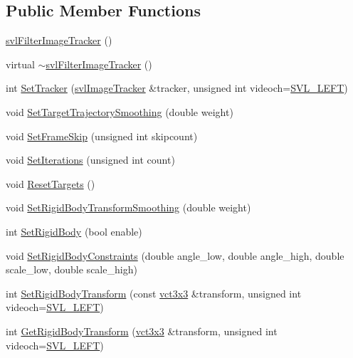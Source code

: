 \subsection*{Public Member Functions}
\begin{DoxyCompactItemize}
\item 
\hyperlink{classsvl_filter_image_tracker_ab2dc7279ace937d9c5f6eb2a5873478c}{svl\-Filter\-Image\-Tracker} ()
\item 
virtual \hyperlink{classsvl_filter_image_tracker_ab055ffc996ecc1bbb30d0ae5aa487996}{$\sim$svl\-Filter\-Image\-Tracker} ()
\item 
int \hyperlink{classsvl_filter_image_tracker_ad67f87d4d599bdd007fb04feb72e4c76}{Set\-Tracker} (\hyperlink{classsvl_image_tracker}{svl\-Image\-Tracker} \&tracker, unsigned int videoch=\hyperlink{svl_definitions_8h_ab9fec7615f19c8df2919eebcab0b187f}{S\-V\-L\-\_\-\-L\-E\-F\-T})
\item 
void \hyperlink{classsvl_filter_image_tracker_ad5a5d26c3cac21daa4843c956a7a73a3}{Set\-Target\-Trajectory\-Smoothing} (double weight)
\item 
void \hyperlink{classsvl_filter_image_tracker_a4a78d211c92d5550f7a7c6a6db90b65c}{Set\-Frame\-Skip} (unsigned int skipcount)
\item 
void \hyperlink{classsvl_filter_image_tracker_a3f6691e08e77208d1b0ca2897b082ac6}{Set\-Iterations} (unsigned int count)
\item 
void \hyperlink{classsvl_filter_image_tracker_a8713ac398b6be0683e08f951c1dd3640}{Reset\-Targets} ()
\item 
void \hyperlink{classsvl_filter_image_tracker_ab7d0a9024fd5fff744a1156265059315}{Set\-Rigid\-Body\-Transform\-Smoothing} (double weight)
\item 
int \hyperlink{classsvl_filter_image_tracker_a7726e5f7fdece4547d1ada917ac232d9}{Set\-Rigid\-Body} (bool enable)
\item 
void \hyperlink{classsvl_filter_image_tracker_a708a3eed66b321649fccd00382c5a82c}{Set\-Rigid\-Body\-Constraints} (double angle\-\_\-low, double angle\-\_\-high, double scale\-\_\-low, double scale\-\_\-high)
\item 
int \hyperlink{classsvl_filter_image_tracker_a7463ac2d5c83270eff29664830ee8a79}{Set\-Rigid\-Body\-Transform} (const \hyperlink{vct_fixed_size_matrix_types_8h_aac4a419dacf9282410675d42ebc86a7c}{vct3x3} \&transform, unsigned int videoch=\hyperlink{svl_definitions_8h_ab9fec7615f19c8df2919eebcab0b187f}{S\-V\-L\-\_\-\-L\-E\-F\-T})
\item 
int \hyperlink{classsvl_filter_image_tracker_a0ba68252868875613e4d7cb036706a56}{Get\-Rigid\-Body\-Transform} (\hyperlink{vct_fixed_size_matrix_types_8h_aac4a419dacf9282410675d42ebc86a7c}{vct3x3} \&transform, unsigned int videoch=\hyperlink{svl_definitions_8h_ab9fec7615f19c8df2919eebcab0b187f}{S\-V\-L\-\_\-\-L\-E\-F\-T})

\end{DoxyCompactItemize}
